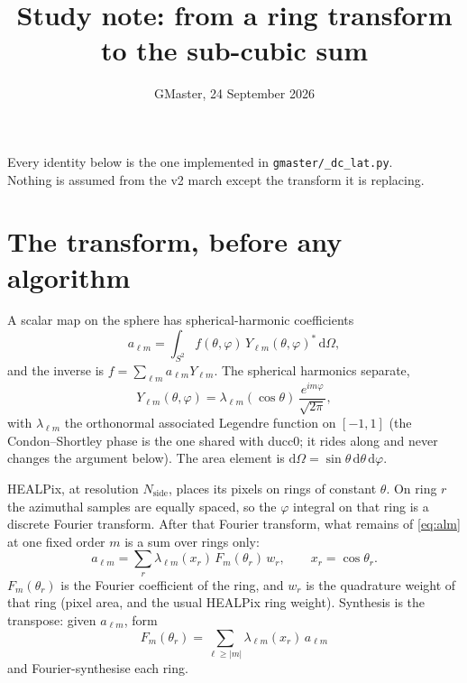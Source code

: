 \documentclass[11pt,a4paper]{article}
\title{\textbf{Study note: from a ring transform to the sub-cubic sum}}
\author{}
\date{GMaster, 24 September 2026}
\numberwithin{equation}{section}
\begin{document}
\maketitle
\vspace{-1.4em}

\begin{center}
{\small Every identity below is the one implemented in \texttt{gmaster/\_dc\_lat.py}.\\
Nothing is assumed from the v2 march except the transform it is replacing.}
\end{center}

\tableofcontents

\section{The transform, before any algorithm}
\label{sec:sht}

A scalar map on the sphere has spherical-harmonic coefficients
\begin{equation}
  a_{\ell m}
  = \int_{S^2} f(\theta,\varphi)\, Y_{\ell m}(\theta,\varphi)^\ast \,\mathrm{d}\Omega,
  \label{eq:alm}
\end{equation}
and the inverse is $f=\sum_{\ell m} a_{\ell m} Y_{\ell m}$.
The spherical harmonics separate,
\[
  Y_{\ell m}(\theta,\varphi)
  = \lambda_{\ell m}(\cos\theta)\, \frac{e^{im\varphi}}{\sqrt{2\pi}},
\]
with $\lambda_{\ell m}$ the orthonormal associated Legendre function on $[-1,1]$
(the Condon--Shortley phase is the one shared with ducc0; it rides along and never
changes the argument below). The area element is $\mathrm{d}\Omega=\sin\theta\,\mathrm{d}\theta\,\mathrm{d}\varphi$.

HEALPix, at resolution $N_{\mathrm{side}}$, places its pixels on rings of constant $\theta$.
On ring $r$ the azimuthal samples are equally spaced, so the $\varphi$ integral on that
ring is a discrete Fourier transform. After that Fourier transform, what remains of
\eqref{eq:alm} at one fixed order $m$ is a sum over rings only:
\begin{equation}
  a_{\ell m}
  = \sum_{r} \lambda_{\ell m}(x_r)\, F_m(\theta_r)\, w_r,
  \qquad x_r=\cos\theta_r.
  \label{eq:lat}
\end{equation}
$F_m(\theta_r)$ is the Fourier coefficient of the ring, and $w_r$ is the quadrature
weight of that ring (pixel area, and the usual HEALPix ring weight).
Synthesis is the transpose: given $a_{\ell m}$, form
\begin{equation}
  F_m(\theta_r) = \sum_{\ell\ge |m|} \lambda_{\ell m}(x_r)\, a_{\ell m}
  \label{eq:syn}
\end{equation}
and Fourier-synthesise each ring.
\end{document}
